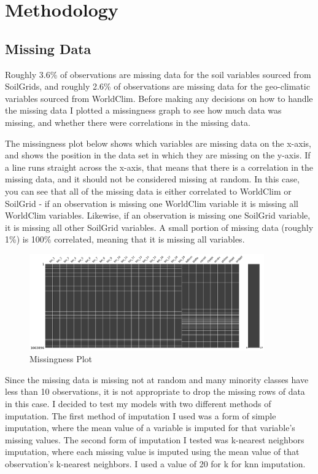 \documentclass[12pt, oneside]{article}
\begin{document}
\section{Methodology}
\label{Methodology}

\begin{normalsize}

\subsection{Missing Data}

Roughly 3.6\% of observations are missing data for the soil variables sourced from SoilGrids, and roughly 2.6\% of observations are missing data for the geo-climatic variables sourced from WorldClim. Before making any decisions on how to handle the missing data I plotted a missingness graph to see how much data was missing, and whether there were correlations in the missing data.

The missingness plot below shows which variables are missing data on the x-axis, and shows the position in the data set in which they are missing on the y-axis. If a line runs straight across the x-axis, that means that there is a correlation in the missing data, and it should not be considered missing at random. In this case, you can see that all of the missing data is either correlated to WorldClim or SoilGrid - if an observation is missing one WorldClim variable it is missing all WorldClim variables. Likewise, if an observation is missing one SoilGrid variable, it is missing all other SoilGrid variables. A small portion of missing data (roughly 1\%) is 100\% correlated, meaning that it is missing all variables.

\begin{figure}[H]
\caption{Missingness Plot}
\centering
\includegraphics[width=0.9\textwidth]{missingno}
\end{figure}

Since the missing data is missing not at random and many minority classes have less than 10 observations, it is not appropriate to drop the missing rows of data in this case. I decided to test my models with two different methods of imputation. The first method of imputation I used was a form of simple imputation, where the mean value of a variable is imputed for that variable's missing values. The second form of imputation I tested was k-nearest neighbors imputation, where each missing value is imputed using the mean value of that observation's k-nearest neighbors. I used a value of 20 for k for knn imputation.


\end{normalsize}
\end{document}
